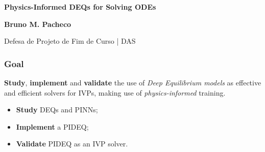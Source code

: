 \documentclass[t]{beamer}
\begin{document}
{
\begin{frame}
\vspace{18mm}
\begin{flushright}
\textcolor{cinza}{\textbf{\Large{
Physics-Informed DEQs for Solving ODEs
}}}
\end{flushright}

\vspace{-6mm}
\begin{flushright}
\textcolor{cinza}{\textbf{\scriptsize{
Bruno M. Pacheco
}}}
\end{flushright}

\vspace{-7mm}
\begin{flushright}
\textcolor{cinza}{\scriptsize{
Defesa de Projeto de Fim de Curso | DAS
}}
\end{flushright}


\end{frame}
}


\begin{frame}
\frametitle{Goal}
\textbf{Study}, \textbf{implement} and \textbf{validate} the use of \emph{Deep Equilibrium models} as effective and efficient solvers for IVPs, making use of \emph{physics-informed} training.

\begin{itemize}
    \item<2-> \textbf{Study} DEQs and PINNs;
    \item<3-> \textbf{Implement} a PIDEQ;
    \item<4-> \textbf{Validate} PIDEQ as an IVP solver.
\end{itemize}
\end{frame}
\end{document}
